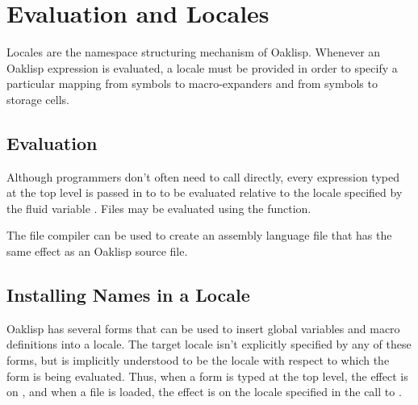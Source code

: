 \chapter{Evaluation and Locales} \label{locales}

Locales are the namespace structuring mechanism of Oaklisp.  Whenever
an Oaklisp expression is evaluated, a locale must be provided in order
to specify a particular mapping from symbols to macro-expanders and
from symbols to storage cells.

\section{Evaluation}


Although programmers don't often need to call  directly,
every expression typed at the top level is passed in to  to
be evaluated relative to the locale specified by the fluid variable
.  Files may be evaluated using the 
function.


The file compiler can be used to create an assembly language file that
has the same effect as an Oaklisp source file.




\section{Installing Names in a Locale}


Oaklisp has several forms that can be used to insert global variables
and macro definitions into a locale.  The target locale isn't
explicitly specified by any of these forms, but is implicitly
understood to be the locale with respect to which the form is being
evaluated.  Thus, when a form is typed at the top level, the effect is
on , and when a file is loaded, the effect is on
the locale specified in the call to .

